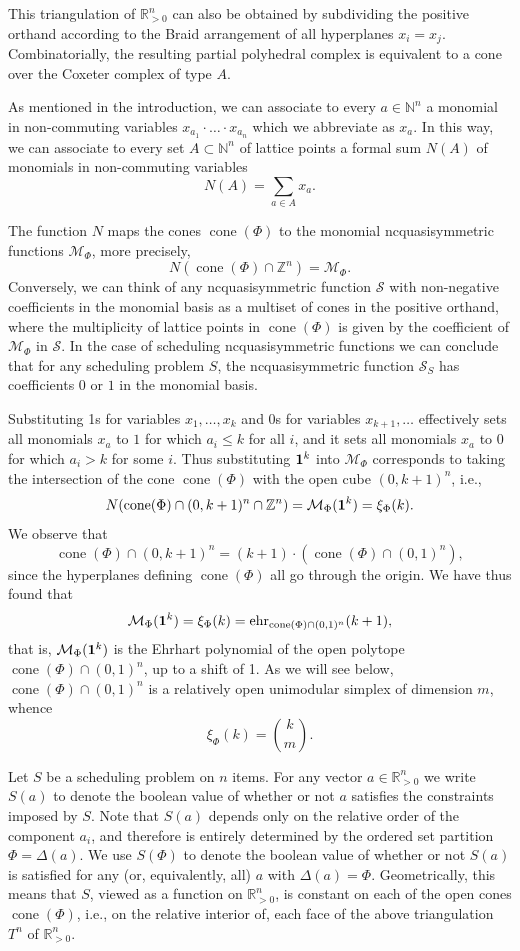 \documentclass[12pt,reqno]{amsart}
\numberwithin{definition}{section}
\theoremstyle{definition}
\newcommand{\RR}{\mathbb{R}}
\newcommand{\NN}{\mathbb{N}}
\newcommand{\ZZ}{\mathbb{Z}}
\newcommand{\SSS}{\mathcal{S}}
\newcommand{\ehr}{\operatorname{ehr}}
\newcommand{\cone}{\operatorname{cone}}
\newcommand{\ncM}{\mathcal{M}}
\begin{document}
This triangulation of $\RR_{> 0}^n$ can also be obtained by subdividing the positive orthand according to the Braid arrangement of all hyperplanes $x_i=x_j$. Combinatorially, the resulting partial polyhedral complex is equivalent to a cone over the Coxeter complex of type $A$. 

As mentioned in the introduction, we can associate to every $a\in\NN^n$ a monomial in non-commuting variables $x_{a_1}\cdot\ldots\cdot x_{a_n}$ which we abbreviate as $x_a$. In this way, we can associate to every set $A\subset\NN^n$ of lattice points a formal sum $N(A)$ of monomials in non-commuting variables
\[
  N(A) = \sum_{a\in A} x_a.
\]

The function $N$ maps the cones $\cone(\Phi)$ to the monomial ncquasisymmetric functions $\ncM_\Phi$, more precisely,
\[
  N(\cone(\Phi)\cap\ZZ^n) = \ncM_\Phi.
\]
Conversely, we can think of any ncquasisymmetric function $\SSS$ with non-negative coefficients in the monomial basis as a multiset of cones in the positive orthand, where the multiplicity of lattice points in $\cone(\Phi)$ is given by the coefficient of $\ncM_\Phi$ in $\SSS$. In the case of scheduling ncquasisymmetric functions we can conclude that for any scheduling problem $S$, the ncquasisymmetric function $\SSS_S$ has coefficients $0$ or $1$ in the monomial basis.

Substituting 1s for variables $x_1,\ldots,x_k$ and 0s for variables $x_{k+1},\ldots$ effectively sets all monomials $x_a$ to $1$ for which $a_i \leq k$ for all $i$, and it sets all monomials $x_a$ to $0$ for which $a_i > k$ for some $i$. Thus substituting ${\bf 1}^k$ into $\ncM_\Phi$ corresponds to taking the intersection of the cone $\cone(\Phi)$ with the open cube $(0,k+1)^n$, i.e.,
\[
 N(\cone(\Phi)\cap(0,k+1)^n\cap\ZZ^n) = \ncM_\Phi({\bf 1}^k) =  \xi_\Phi(k). 
\]
We observe that
\[
  \cone(\Phi)\cap(0,k+1)^n = (k+1)\cdot (\cone(\Phi)\cap(0,1)^n), 
\]
since the hyperplanes defining $\cone(\Phi)$ all go through the origin. We have thus found that
\begin{eqnarray}
\label{eqn:spec ncM}
  \ncM_\Phi({\bf 1}^k) = \xi_\Phi(k) = \ehr_{\cone(\Phi)\cap(0,1)^n}(k+1),
\end{eqnarray}
that is, $\ncM_\Phi({\bf 1}^k)$ is the Ehrhart polynomial of the open polytope $\cone(\Phi)\cap(0,1)^n$, up to a shift of 1. As we will see below, $\cone(\Phi)\cap(0,1)^n$ is a relatively open unimodular simplex of dimension $m$, whence
\[
  \xi_\Phi(k) = \binom{k}{m}.
\]

Let $S$ be a scheduling problem on $n$ items. For any vector $a\in\RR^n_{> 0}$ we write $S(a)$ to denote the boolean value of whether or not $a$ satisfies the constraints imposed by $S$. Note that $S(a)$ depends only on the relative order of the component $a_i$, and therefore is entirely determined by the ordered set partition $\Phi=\Delta(a)$. We use $S(\Phi)$ to denote the boolean value of whether or not $S(a)$ is satisfied for any (or, equivalently, all) $a$ with $\Delta(a)=\Phi$. Geometrically, this means that $S$, viewed as a function on $\RR^n_{>0}$, is constant on each of the open cones $\cone(\Phi)$, i.e., on the relative interior of, each face of the above triangulation $T^n$ of $\RR^n_{> 0}$.
\end{document}
